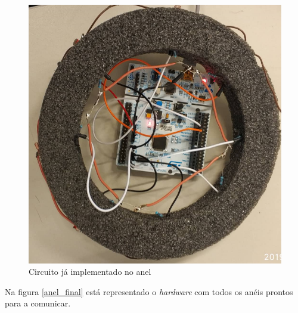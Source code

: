 \begin{figure}[!htb]
\centering
\includegraphics[scale=0.35]{Figuras/anel.PNG}
\caption{Circuito já implementado no anel}
\label{anel}
\end{figure}

\newpage
Na figura \ref{anel_final} está representado o \textit{hardware} com todos os anéis prontos para a comunicar.

